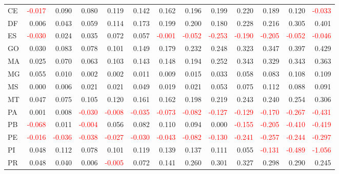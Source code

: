 \documentclass[a4paper,preprint,11pt,authoryear]{elsarticle}
\begin{document}
\begin{table}
{\begin{tabular}{lrrrrrrrrrrrr}
      CE & \textcolor{red}{-0.017} & 0.090 & 0.080 & 0.119 & 0.142 & 0.162 & 0.196 & 0.199 & 0.220 & 0.189 & 0.120 & \textcolor{red}{-0.033} \\
      DF & 0.006 & 0.043 & 0.059 & 0.114 & 0.173 & 0.199 & 0.200 & 0.180 & 0.228 & 0.216 & 0.305 & 0.401 \\
      ES & \textcolor{red}{-0.030} & 0.024 & 0.035 & 0.072 & 0.057 & \textcolor{red}{-0.001} & \textcolor{red}{-0.052} & \textcolor{red}{-0.253} & \textcolor{red}{-0.190} & \textcolor{red}{-0.205} & \textcolor{red}{-0.052} & \textcolor{red}{-0.046} \\
      GO & 0.030 & 0.083 & 0.078 & 0.101 & 0.149 & 0.179 & 0.232 & 0.248 & 0.323 & 0.347 & 0.397 & 0.429 \\
      MA & 0.025 & 0.070 & 0.063 & 0.103 & 0.143 & 0.148 & 0.194 & 0.252 & 0.343 & 0.329 & 0.343 & 0.363 \\
      MG & 0.055 & 0.010 & 0.002 & 0.002 & 0.011 & 0.009 & 0.015 & 0.033 & 0.058 & 0.083 & 0.108 & 0.109 \\
      MS & 0.000 & 0.006 & 0.021 & 0.021 & 0.049 & 0.019 & 0.021 & 0.053 & 0.075 & 0.112 & 0.088 & 0.091 \\
      MT & 0.047 & 0.075 & 0.105 & 0.120 & 0.161 & 0.162 & 0.198 & 0.219 & 0.243 & 0.240 & 0.254 & 0.306 \\
      PA & 0.001 & 0.008 & \textcolor{red}{-0.030} & \textcolor{red}{-0.008} & \textcolor{red}{-0.035} & \textcolor{red}{-0.073} & \textcolor{red}{-0.082} & \textcolor{red}{-0.127} & \textcolor{red}{-0.129} & \textcolor{red}{-0.170} & \textcolor{red}{-0.267} & \textcolor{red}{-0.431} \\
      PB & \textcolor{red}{-0.068} & 0.011 & \textcolor{red}{-0.004} & 0.056 & 0.082 & 0.110 & 0.094 & 0.000 & \textcolor{red}{-0.155} & \textcolor{red}{-0.205} & \textcolor{red}{-0.410} & \textcolor{red}{-0.419} \\
      PE & \textcolor{red}{-0.016} & \textcolor{red}{-0.036} & \textcolor{red}{-0.038} & \textcolor{red}{-0.027} & \textcolor{red}{-0.030} & \textcolor{red}{-0.043} & \textcolor{red}{-0.082} & \textcolor{red}{-0.130} & \textcolor{red}{-0.241} & \textcolor{red}{-0.257} & \textcolor{red}{-0.244} & \textcolor{red}{-0.297} \\
      PI & 0.048 & 0.112 & 0.078 & 0.101 & 0.119 & 0.139 & 0.137 & 0.111 & 0.055 & \textcolor{red}{-0.131} & \textcolor{red}{-0.489} & \textcolor{red}{-1.056} \\
      PR & 0.048 & 0.040 & 0.006 & \textcolor{red}{-0.005} & 0.072 & 0.141 & 0.260 & 0.301 & 0.327 & 0.298 & 0.290 & 0.245 \\

\end{tabular}}
\end{table}
\end{document}
